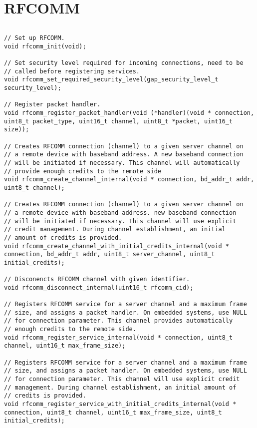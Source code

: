 \section{RFCOMM}
\label{appendix:api_rfcomm}
$ $
\begin{lstlisting}
// Set up RFCOMM.
void rfcomm_init(void);

// Set security level required for incoming connections, need to be 
// called before registering services.
void rfcomm_set_required_security_level(gap_security_level_t security_level);

// Register packet handler.
void rfcomm_register_packet_handler(void (*handler)(void * connection, uint8_t packet_type, uint16_t channel, uint8_t *packet, uint16_t size));

// Creates RFCOMM connection (channel) to a given server channel on 
// a remote device with baseband address. A new baseband connection 
// will be initiated if necessary. This channel will automatically 
// provide enough credits to the remote side
void rfcomm_create_channel_internal(void * connection, bd_addr_t addr, uint8_t channel);

// Creates RFCOMM connection (channel) to a given server channel on 
// a remote device with baseband address. new baseband connection 
// will be initiated if necessary. This channel will use explicit 
// credit management. During channel establishment, an initial  
// amount of credits is provided.
void rfcomm_create_channel_with_initial_credits_internal(void * connection, bd_addr_t addr, uint8_t server_channel, uint8_t initial_credits);

// Disconencts RFCOMM channel with given identifier. 
void rfcomm_disconnect_internal(uint16_t rfcomm_cid);

// Registers RFCOMM service for a server channel and a maximum frame 
// size, and assigns a packet handler. On embedded systems, use NULL 
// for connection parameter. This channel provides automatically  
// enough credits to the remote side.
void rfcomm_register_service_internal(void * connection, uint8_t channel, uint16_t max_frame_size);

// Registers RFCOMM service for a server channel and a maximum frame 
// size, and assigns a packet handler. On embedded systems, use NULL 
// for connection parameter. This channel will use explicit credit
// management. During channel establishment, an initial amount of  
// credits is provided.
void rfcomm_register_service_with_initial_credits_internal(void * connection, uint8_t channel, uint16_t max_frame_size, uint8_t initial_credits);


\end{lstlisting}

